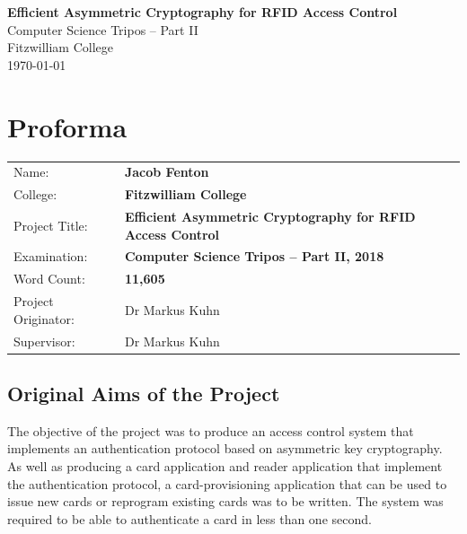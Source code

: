 \documentclass[12pt,a4paper,twoside,openright]{report}
\begin{document}





\pagestyle{empty}


\vspace*{60mm}
\begin{center}
\Huge
\textbf{Efficient Asymmetric Cryptography for RFID Access Control} \\[5mm]
Computer Science Tripos -- Part II \\[5mm]
Fitzwilliam College \\[5mm]
\today  %
\end{center}


\pagestyle{plain}

\chapter*{Proforma}

{\large
\begin{tabularx}{\linewidth}{l X}
Name:               & \bf Jacob Fenton                       \\
College:            & \bf Fitzwilliam College                     \\
Project Title:      & \bf Efficient Asymmetric Cryptography for RFID Access Control \\
Examination:        & \bf Computer Science Tripos -- Part II, 2018  \\
Word Count:         & \bf 11,605  \\
Project Originator: & Dr Markus Kuhn                    \\
Supervisor:         & Dr Markus Kuhn                    \\ 
\end{tabularx}
}

\section*{Original Aims of the Project}

The objective of the project was to produce an access control system that implements an authentication protocol based on asymmetric key cryptography. As well as producing a card application and reader application that implement the authentication protocol, a card-provisioning application that can be used to issue new cards or reprogram existing cards was to be written. The system was required to be able to authenticate a card in less than one second.
\end{document}
